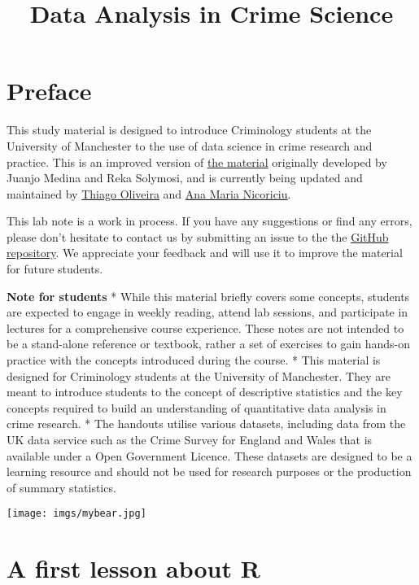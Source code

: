 \documentclass[
]{book}
\title{Data Analysis in Crime Science}
\author{}
\date{\vspace{-2.5em}}
\begin{document}
\maketitle

{
\setcounter{tocdepth}{1}
\tableofcontents
}
\chapter*{Preface}\label{preface}

This study material is designed to introduce Criminology students at the University of Manchester to the use of data science in crime research and practice. This is an improved version of \href{https://jjmedinaariza.github.io/modelling_book/}{the material} originally developed by Juanjo Medina and Reka Solymosi, and is currently being updated and maintained by \href{thiago.oliveira@manchester.ac.uk}{Thiago Oliveira} and \href{anamaria.nicoriciu@manchester.ac.uk}{Ana Maria Nicoriciu}.

This lab note is a work in process. If you have any suggestions or find any errors, please don't hesitate to contact us by submitting an issue to the the \href{https://github.com/eonk/CrimeSciData}{GitHub repository}. We appreciate your feedback and will use it to improve the material for future students.

\textbf{Note for students}
* While this material briefly covers some concepts, students are expected to engage in weekly reading, attend lab sessions, and participate in lectures for a comprehensive course experience. These notes are not intended to be a stand-alone reference or textbook, rather a set of exercises to gain hands-on practice with the concepts introduced during the course.
* This material is designed for Criminology students at the University of Manchester. They are meant to introduce students to the concept of descriptive statistics and the key concepts required to build an understanding of quantitative data analysis in crime research.
* The handouts utilise various datasets, including data from the UK data service such as the Crime Survey for England and Wales that is available under a Open Government Licence. These datasets are designed to be a learning resource and should not be used for research purposes or the production of summary statistics.

\texttt{[image: imgs/mybear.jpg]}

\chapter{A first lesson about R}\label{a-first-lesson-about-r}
\end{document}
